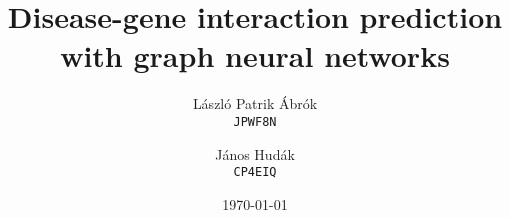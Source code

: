 \documentclass[11pt]{article}
\title{ Disease-gene interaction prediction with graph neural networks }
\author{
    László Patrik Ábrók\\
    \texttt{JPWF8N}
    \and
    János Hudák\\
    \texttt{CP4EIQ}
}
\date{\today}
\begin{document}
\maketitle	
\pagebreak

\tableofcontents
\pagebreak








\end{document}
